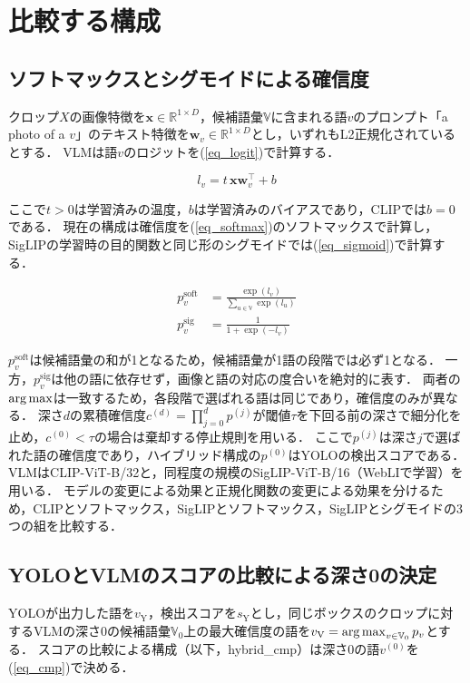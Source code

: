 \section{比較する構成}
\subsection{ソフトマックスとシグモイドによる確信度}
クロップ$ X $の画像特徴を$ {\mathbf x} \in {\mathbb R}^{1 \times D} $，候補語彙$ {\mathbb V} $に含まれる語$ v $のプロンプト「a photo of a $ v $」のテキスト特徴を$ {\mathbf w}_v \in {\mathbb R}^{1 \times D} $とし，いずれもL2正規化されているとする．
VLMは語$ v $のロジットを(\ref{eq_logit})で計算する．

\begin{equation}
    l_v = t \, {\mathbf x} {\mathbf w}_v^{\top} + b
    \label{eq_logit}
\end{equation}

\noindent
ここで$ t > 0 $は学習済みの温度，$ b $は学習済みのバイアスであり，CLIPでは$ b = 0 $である．
現在の構成は確信度を(\ref{eq_softmax})のソフトマックスで計算し，SigLIPの学習時の目的関数と同じ形のシグモイドでは(\ref{eq_sigmoid})で計算する．

\begin{align}
    p_v^{\mathrm{soft}} &= \frac{\exp(l_v)}{\sum_{u \in {\mathbb V}} \exp(l_u)}
    \label{eq_softmax} \\
    p_v^{\mathrm{sig}} &= \frac{1}{1 + \exp(-l_v)}
    \label{eq_sigmoid}
\end{align}

\noindent
$ p_v^{\mathrm{soft}} $は候補語彙の和が1となるため，候補語彙が1語の段階では必ず1となる．
一方，$ p_v^{\mathrm{sig}} $は他の語に依存せず，画像と語の対応の度合いを絶対的に表す．
両者の$ \operatorname*{arg\,max} $は一致するため，各段階で選ばれる語は同じであり，確信度のみが異なる．
深さ$ d $の累積確信度$ c^{(d)} = \prod_{j=0}^{d} p^{(j)} $が閾値$ \tau $を下回る前の深さで細分化を止め，$ c^{(0)} < \tau $の場合は棄却する停止規則を用いる．
ここで$ p^{(j)} $は深さ$ j $で選ばれた語の確信度であり，ハイブリッド構成の$ p^{(0)} $はYOLOの検出スコアである．
VLMはCLIP-ViT-B/32と，同程度の規模のSigLIP-ViT-B/16（WebLIで学習）を用いる．
モデルの変更による効果と正規化関数の変更による効果を分けるため，CLIPとソフトマックス，SigLIPとソフトマックス，SigLIPとシグモイドの3つの組を比較する．

\subsection{YOLOとVLMのスコアの比較による深さ0の決定}
YOLOが出力した語を$ v_{\mathrm{Y}} $，検出スコアを$ s_{\mathrm{Y}} $とし，同じボックスのクロップに対するVLMの深さ0の候補語彙$ {\mathbb V}_0 $上の最大確信度の語を$ v_{\mathrm{V}} = \operatorname*{arg\,max}_{v \in {\mathbb V}_0} p_v $とする．
スコアの比較による構成（以下，hybrid\_cmp）は深さ0の語$ v^{(0)} $を(\ref{eq_cmp})で決める．

